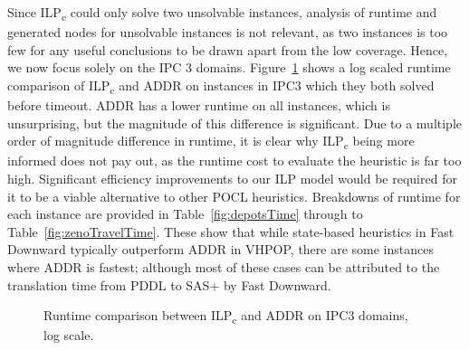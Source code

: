 Since ILP\textsubscript{c} could only solve two unsolvable instances, analysis of runtime and generated nodes for unsolvable instances is not relevant, as two instances is too few for any useful conclusions to be drawn apart from the low coverage. Hence, we now focus solely on the IPC 3 domains. Figure~\ref{fig:runtime} shows a log scaled runtime comparison of ILP\textsubscript{c} and ADDR on instances in IPC3 which they both solved before timeout. ADDR has a lower runtime on all instances, which is unsurprising, but the magnitude of this difference is significant. Due to a multiple order of magnitude difference in runtime, it is clear why ILP\textsubscript{c} being more informed does not pay out, as the runtime cost to evaluate the heuristic is far too high. Significant efficiency improvements to our ILP model would be required for it to be a viable alternative to other POCL heuristics. Breakdowns of runtime for each instance are provided in Table~\ref{fig:depotsTime} through to Table~\ref{fig:zenoTravelTime}. These show that while state-based heuristics in Fast Downward typically outperform ADDR in VHPOP, there are some instances where ADDR is fastest; although most of these cases can be attributed to the translation time from PDDL to SAS+ by Fast Downward.


\begin{figure}[!hbt]
	\centering
	\caption{Runtime comparison between ILP\textsubscript{c} and ADDR on IPC3 domains, log scale.}
        \label{fig:runtime}
\end{figure}


